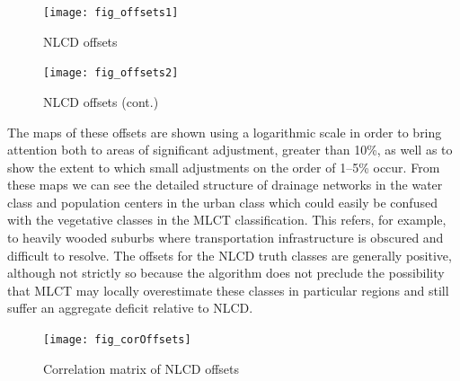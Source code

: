 \begin{figure}[hpt]
  \centering


\texttt{[image: fig\_offsets1]}
  \caption{NLCD offsets}
  \label{fig:offsets1} 
\end{figure} 


\begin{figure}[hpt]
  \centering


\texttt{[image: fig\_offsets2]}
  \caption{NLCD offsets (cont.)}
  \label{fig:offsets2} 
\end{figure} 


The maps of these offsets are shown using a logarithmic scale in
order to bring attention both to areas of significant adjustment,
greater than 10\%, as well as to show the extent to which small
adjustments on the order of 1--5\% occur.  From these maps we can see
the detailed structure of drainage networks in the water class and
population centers in the urban class which could easily be confused
with the vegetative classes in the MLCT classification.  This refers,
for example, to heavily wooded suburbs where transportation
infrastructure is obscured and difficult to resolve.  The offsets for
the NLCD truth classes are generally positive, although not strictly
so because the algorithm does not preclude the possibility that MLCT
may locally overestimate these classes in particular regions and still
suffer an aggregate deficit relative to NLCD.


\begin{figure}[hpt]
  \centering
    \texttt{[image: fig\_corOffsets]}
  \caption{Correlation matrix of NLCD offsets}
  \label{fig:corOffsets} 
\end{figure} 

